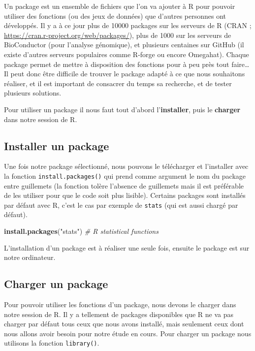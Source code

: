 \documentclass[
]{book}
\newenvironment{Shaded}{\begin{snugshade}}{\end{snugshade}}
\newcommand{\CommentTok}[1]{\textcolor[rgb]{0.56,0.35,0.01}{\textit{#1}}}
\newcommand{\KeywordTok}[1]{\textcolor[rgb]{0.13,0.29,0.53}{\textbf{#1}}}
\newcommand{\NormalTok}[1]{#1}
\newcommand{\StringTok}[1]{\textcolor[rgb]{0.31,0.60,0.02}{#1}}
\begin{document}
Un package est un ensemble de fichiers que l'on va ajouter à R pour pouvoir utiliser des fonctions (ou des jeux de données) que d'autres personnes ont développés. Il y a à ce jour plus de 10000 packages sur les serveurs de R (CRAN ; \url{https://cran.r-project.org/web/packages/}), plus de 1000 sur les serveurs de BioConductor (pour l'analyse génomique), et plusieurs centaines sur GitHub (il existe d'autres serveurs populaires comme R-forge ou encore Omegahat). Chaque package permet de mettre à disposition des fonctions pour à peu près tout faire\ldots{} Il peut donc être difficile de trouver le package adapté à ce que nous souhaitons réaliser, et il est important de consacrer du temps sa recherche, et de tester plusieurs solutions.

Pour utiliser un package il nous faut tout d'abord l'\textbf{installer}, puis le \textbf{charger} dans notre session de R.

\hypertarget{installer-un-package}{%
\subsection{Installer un package}\label{installer-un-package}}

Une fois notre package sélectionné, nous pouvons le télécharger et l'installer avec la fonction \texttt{install.packages()} qui prend comme argument le nom du package entre guillemets (la fonction tolère l'absence de guillemets mais il est préférable de les utiliser pour que le code soit plus lisible). Certains packages sont installés par défaut avec R, c'est le cas par exemple de \texttt{stats} (qui est aussi chargé par défaut).

\begin{Shaded}
\begin{Highlighting}[]
\KeywordTok{install.packages}\NormalTok{(}\StringTok{"stats"}\NormalTok{) }\CommentTok{# R statistical functions}
\end{Highlighting}
\end{Shaded}

L'installation d'un package est à réaliser une seule fois, ensuite le package est sur notre ordinateur.

\hypertarget{charger-un-package}{%
\subsection{Charger un package}\label{charger-un-package}}

Pour pouvoir utiliser les fonctions d'un package, nous devons le charger dans notre session de R. Il y a tellement de packages disponibles que R ne va pas charger par défaut tous ceux que nous avons installé, mais seulement ceux dont nous allons avoir besoin pour notre étude en cours. Pour charger un package nous utilisons la fonction \texttt{library()}.
\end{document}
